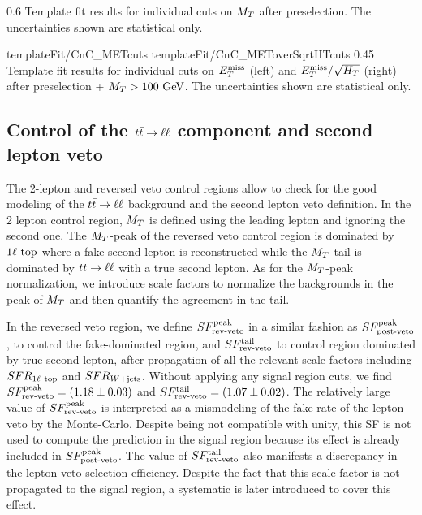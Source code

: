                      {0.6}
                     {Template fit results for individual cuts on $M_T$ after
                     preselection. The uncertainties shown are statistical only.}

                         {templateFit/CnC_METcuts}
                         {templateFit/CnC_METoverSqrtHTcuts}
                         {0.45}
                         {Template fit results for individual cuts on $E_T^\text{miss}$ (left)
                         and $E_T^\text{miss}/\sqrt{H_T}$ (right) after preselection + $M_T > 100~\text{GeV}$.
                         The uncertainties shown are statistical only.}

        \subsection{Control of the $t\bar{t} \rightarrow \ell \ell$ component and second lepton veto \label{sec:analysis_controlDileptonTop}}

        The 2-lepton and reversed veto control regions allow to check for the good modeling
        of the $t\bar{t} \rightarrow \ell \ell$ background and the second lepton veto definition. In the
        2 lepton control region, $M_T$ is defined using the leading lepton and ignoring
        the second one. The $M_T$-peak of the reversed veto control region is dominated by
        $1\ell~\text{top}$ where a fake second lepton is reconstructed while the $M_T$-tail
        is dominated by $t\bar{t} \rightarrow \ell \ell$ with a true second lepton. As for the $M_T$-peak
        normalization, we introduce scale factors to normalize the backgrounds in the peak
        of $M_T$ and then quantify the agreement in the tail.

        In the reversed veto region, we define $SF_{\text{rev-veto}}^{\text{peak}}$ in a similar fashion as $SF_{\text{post-veto}}^{\text{peak}}$,
        to control the fake-dominated region, and $SF_{\text{rev-veto}}^{\text{tail}}$ to control region dominated
        by true second lepton, after propagation of all the relevant scale factors including
        $SFR_{1\ell~\text{top}}$ and $SFR_{\text{$W$+jets}}$.
        Without applying any signal region cuts, we find $SF_{\text{rev-veto}}^{\text{peak}} = (1.18 \pm 0.03)$ and
        $SF_{\text{rev-veto}}^{\text{tail}} = (1.07 \pm 0.02)$. The relatively large value of $SF_{\text{rev-veto}}^{\text{peak}}$ is
        interpreted as a mismodeling of the fake rate of the lepton veto by the Monte-Carlo.
        Despite being not compatible with unity, this SF is not used to compute the prediction
        in the signal region because its effect is already included in $SF_{\text{post-veto}}^{\text{peak}}$. The
        value of $SF_{\text{rev-veto}}^{\text{tail}}$ also manifests a discrepancy in the lepton veto selection
        efficiency. Despite the fact that this scale factor is not propagated to the
        signal region, a systematic is later introduced to cover this effect.

